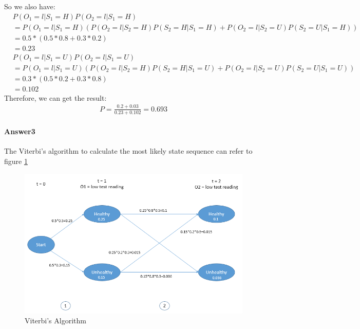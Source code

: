 \documentclass[paper=a4, fontsize=11pt]{scrartcl} %
\numberwithin{equation}{section} %
\numberwithin{figure}{section} %
\numberwithin{table}{section} %
\begin{document}
So we also have:
\begin{align*}
&P\left ( O_{1}=l | S_{1}=H \right )P\left ( O_{2}=l | S_{1}=H \right )
\\&=P\left ( O_{1}=l | S_{1}=H \right )\left ( P\left ( O_{2}=l|S_{2}=H \right )P\left ( S_{2}=H|S_{1}=H \right )+P\left ( O_{2}=l|S_{2}=U \right )P\left ( S_{2}=U|S_{1}=H \right )  \right )
\\&=0.5*\left ( 0.5*0.8+0.3*0.2 \right )
\\&=0.23
\end{align*}
\begin{align*}
&P\left ( O_{1}=l | S_{1}=U \right )P\left ( O_{2}=l | S_{1}=U \right )
\\&=P\left ( O_{1}=l | S_{1}=U \right )\left ( P\left ( O_{2}=l|S_{2}=H \right )P\left ( S_{2}=H|S_{1}=U \right )+P\left ( O_{2}=l|S_{2}=U \right )P\left ( S_{2}=U|S_{1}=U \right )  \right )
\\&=0.3*\left ( 0.5*0.2+0.3*0.8 \right )
\\&=0.102
\end{align*}
Therefore, we can get the result:
\begin{align*}
P=\frac{0.2+0.03}{0.23+0.102}=0.693
\end{align*}

\paragraph{\textbf{Answer3}}
The Viterbi's algorithm to calculate the most likely state sequence can refer to figure \ref{fig:most likely state sequence}
\begin{figure}[H]
	\centering
	\includegraphics[scale=0.5]{./most_likely_state_sequence.png}
	\caption{Viterbi's Algorithm}
	\label{fig:most likely state sequence}
\end{figure}
\end{document}
